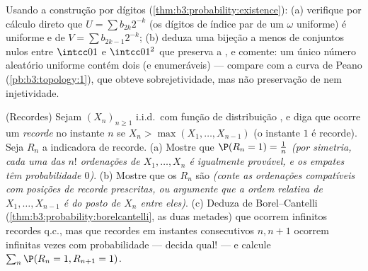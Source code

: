 \begin{exercise}[$\star\star$]\label{exo:b3:probability:10}
Usando a construção por dígitos (\cref{thm:b3:probability:existence}):
(a) verifique por cálculo direto que $U = \sum b_{2k}2^{-k}$ (os dígitos de índice par de
um $\omega$ uniforme) é uniforme e  de $V = \sum b_{2k-1}2^{-k}$;
(b) deduza uma bijeção  a menos de conjuntos nulos entre $\intcc01$
e $\intcc01^2$ que preserva a , e comente: um único número aleatório
uniforme contém dois (e enumeráveis)  --- compare com a
curva de Peano (\cref{pb:b3:topology:1}), que obteve sobrejetividade, mas não
preservação de  nem injetividade.
\end{exercise}

\begin{exercise}[$\star\star$]\label{exo:b3:probability:11}
(Recordes) Sejam $(X_n)_{n\geq1}$ i.i.d.\ com função de distribuição , e
diga que ocorre um \emph{recorde} no instante $n$ se $X_n > \max(X_1, \dots, X_{n-1})$ (o
instante $1$ é recorde). Seja $R_n$ a indicadora de recorde.
(a) Mostre que $\P(R_n = 1) = \frac1n$ \emph{(por simetria, cada uma das $n!$
ordenações de $X_1, \dots, X_n$ é igualmente provável, e os empates têm probabilidade
$0$)}.
(b) Mostre que os $R_n$ são \emph{} \emph{(conte as
ordenações compatíveis com posições de recorde prescritas, ou argumente
que a ordem relativa de $X_1, \dots, X_{n-1}$ é  do posto de $X_n$ entre
eles)}.
(c) Deduza de Borel--Cantelli (\cref{thm:b3:probability:borelcantelli}, as duas metades) que
ocorrem infinitos recordes q.c., mas que recordes em instantes
consecutivos $n, n+1$ ocorrem infinitas vezes com probabilidade ---
decida qual! --- e calcule $\sum_n\P(R_n = 1, R_{n+1} = 1)$.
\end{exercise}

